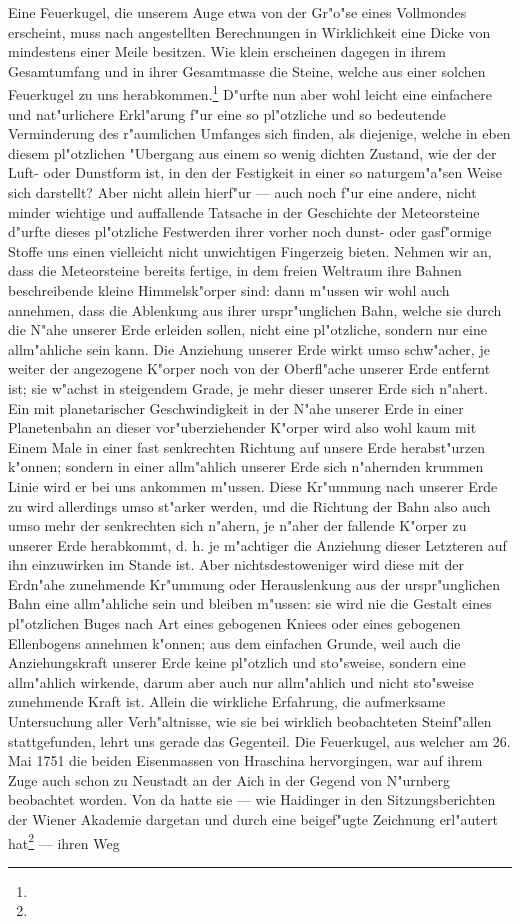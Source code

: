 \documentclass[a4paper, 8pt, oneside, polutonikogreek, german]{article}
\begin{document}
Eine Feuerkugel, die unserem Auge etwa von der Gr"o"se eines Vollmondes erscheint, muss nach angestellten Berechnungen in Wirklichkeit eine Dicke von mindestens einer Meile besitzen. Wie klein erscheinen dagegen in ihrem Gesamtumfang und in ihrer Gesamtmasse die Steine, welche aus einer solchen Feuerkugel zu uns herabkommen.\footnote{} D"urfte nun aber wohl leicht eine einfachere und nat"urlichere Erkl"arung f"ur eine so pl"otzliche und so bedeutende Verminderung des r"aumlichen Umfanges sich finden, als diejenige, welche in eben diesem pl"otzlichen "Ubergang aus einem so wenig dichten Zustand, wie der der Luft- oder Dunstform ist, in den der Festigkeit in einer so naturgem"a"sen Weise sich darstellt? Aber nicht allein hierf"ur --- auch noch f"ur eine andere, nicht minder wichtige und auffallende Tatsache in der Geschichte der Meteorsteine d"urfte dieses pl"otzliche Festwerden ihrer vorher noch dunst- oder gasf"ormige Stoffe uns einen vielleicht nicht unwichtigen Fingerzeig bieten. Nehmen wir an, dass die Meteorsteine bereits fertige, in dem freien Weltraum ihre Bahnen beschreibende kleine Himmelsk"orper sind: dann m"ussen wir wohl auch annehmen, dass die Ablenkung aus ihrer urspr"unglichen Bahn, welche sie durch die N"ahe unserer Erde erleiden sollen, nicht eine pl"otzliche, sondern nur eine allm"ahliche sein kann. Die Anziehung unserer Erde wirkt umso schw"acher, je weiter der angezogene K"orper noch von der Oberfl"ache unserer Erde entfernt ist; sie w"achst in steigendem Grade, je mehr dieser unserer Erde sich n"ahert. Ein mit planetarischer Geschwindigkeit in der N"ahe unserer Erde in einer Planetenbahn an dieser vor"uberziehender K"orper wird also wohl kaum mit Einem Male in einer fast senkrechten Richtung auf unsere Erde herabst"urzen k"onnen; sondern in einer allm"ahlich unserer Erde sich n"ahernden krummen Linie wird er bei uns ankommen m"ussen. Diese Kr"ummung nach unserer Erde zu wird allerdings umso st"arker werden, und die Richtung der Bahn also auch umso mehr der senkrechten sich n"ahern, je n"aher der fallende K"orper zu unserer Erde herabkommt, d. h. je m"achtiger die Anziehung dieser Letzteren auf ihn einzuwirken im Stande ist. Aber nichtsdestoweniger wird diese mit der Erdn"ahe zunehmende Kr"ummung oder Herauslenkung aus der urspr"unglichen Bahn eine allm"ahliche sein und bleiben m"ussen: sie wird nie die Gestalt eines pl"otzlichen Buges nach Art eines gebogenen Kniees oder eines gebogenen Ellenbogens annehmen k"onnen; aus dem einfachen Grunde, weil auch die Anziehungskraft unserer Erde keine pl"otzlich und sto"sweise, sondern eine allm"ahlich wirkende, darum aber auch nur allm"ahlich und nicht sto"sweise zunehmende Kraft ist. Allein die wirkliche Erfahrung, die aufmerksame Untersuchung aller Verh"altnisse, wie sie bei wirklich beobachteten Steinf"allen stattgefunden, lehrt uns gerade das Gegenteil. Die Feuerkugel, aus welcher am 26. Mai 1751 die beiden Eisenmassen von Hraschina hervorgingen, war auf ihrem Zuge auch schon zu Neustadt an der Aich in der Gegend von N"urnberg beobachtet worden. Von da hatte sie --- wie Haidinger in den Sitzungsberichten der Wiener Akademie dargetan und durch eine beigef"ugte Zeichnung erl"autert hat\footnote{} --- ihren Weg 
\end{document}
